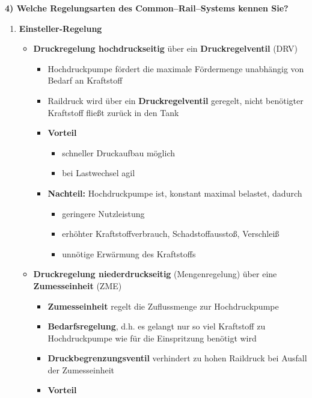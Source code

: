 \textbf{4) Welche Regelungsarten des Common--Rail--Systems kennen Sie?}

\begin{enumerate}
\item
  \textbf{Einsteller-Regelung}

  \begin{itemize}
  \item
    \textbf{Druckregelung hochdruckseitig} über ein
    \textbf{Druckregelventil} (DRV)

    \begin{itemize}
    \item
      Hochdruckpumpe fördert die maximale Fördermenge unabhängig von
      Bedarf an Kraftstoff
    \item
      Raildruck wird über ein \textbf{Druckregelventil} geregelt, nicht
      benötigter Kraftstoff fließt zurück in den Tank
    \item
      \textbf{Vorteil}

      \begin{itemize}
      \item
        schneller Druckaufbau möglich
      \item
        bei Lastwechsel agil
      \end{itemize}
    \item
      \textbf{Nachteil:} Hochdruckpumpe ist, konstant maximal belastet,
      dadurch

      \begin{itemize}
      \item
        geringere Nutzleistung
      \item
        erhöhter Kraftstoffverbrauch, Schadstoffausstoß, Verschleiß
      \item
        unnötige Erwärmung des Kraftstoffs
      \end{itemize}
    \end{itemize}
  \item
    \textbf{Druckregelung niederdruckseitig} (Mengenregelung) über eine
    \textbf{Zumesseinheit} (ZME)

    \begin{itemize}
    \item
      \textbf{Zumesseinheit} regelt die Zuflussmenge zur Hochdruckpumpe
    \item
      \textbf{Bedarfsregelung}, d.h. es gelangt nur so viel Kraftstoff
      zu Hochdruckpumpe wie für die Einspritzung benötigt wird
    \item
      \textbf{Druckbegrenzungsventil} verhindert zu hohen Raildruck bei
      Ausfall der Zumesseinheit
    \item
      \textbf{Vorteil}


\end{itemize}
\end{itemize}
\end{enumerate}
